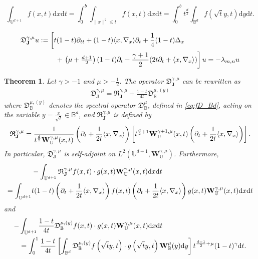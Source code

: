 \documentclass[10pt,a4paper]{amsart}
\newtheorem{thm}{Theorem}
\def\BB{{\mathbb B}}
\def\Jb{{\mathbf J}}
\def\UU{{\mathbb U}}
\def\Wb{{\mathbf W}}
\def\d{\mathrm{d}}
\def\f{\frac}
\def\fD{{\mathfrak D}}
\def\fR{{\mathfrak R}}
\def\g{{\gamma}}
\def\l{{\lambda}}
\def\la{{\langle}}
\def\ra{{\rangle}}
\begin{document}
\begin{equation}\label{intUU=}
  \int_{\UU^{d+1} } f(x,t) \d x \d t  = \int_0^b \int_{\|x\|^2 \le t} f(x,t) \d x \d t =
    \int_0^b t^{\frac{d}{2}} \int_{\BB^d} f\left(\sqrt{t} y, t\right) \d y \d t. 
\end{equation}

\begin{align}\label{eq:diff-eqnUU}
 & \fD_{\Jb}^{\g,\mu} u : = \left[ t (1-t) \partial_{tt} + (1-t) \la x,\nabla_x\ra \partial_t + \frac{1}{4} (1-t)\Delta_x  \right. \\
      & \qquad   \qquad  \quad
      +\left.   \left(\mu+\tfrac{d+1}{2}\right)(1-t)\partial_t   - \frac{\g+1}{2} (2t \partial_t +  \la x,\nabla_x\ra) \right]  u 
       = - \l_{m,n} u \notag
\end{align}

\begin{thm} 
Let $\g > -1$ and $\mu > -\f12$. The operator $ \fD_{\Jb}^{\g,\mu}$ can be rewritten as
\begin{align} \label{eq:fD_UU2}
 \fD_{\Jb}^{\g,\mu} =  \fR_\Jb^{\g,\mu}  + \frac{1-t}{4t} \fD_\BB^{\mu, (y)}
\end{align}
where $\fD_\BB^{\mu, (y)}$ denotes the spectral operator $\fD_\BB^\mu$, defined in \eqref{eq:fD_Bd}, acting on 
the variable $y = \frac{x}{\sqrt{t}} \in \BB^d$, and $\fR_\Jb^{\g,\mu} $ is defined by 
\begin{align*}
 \fR_\Jb^{\g,\mu} =  \frac{1}{t^{\f d 2} \Wb_\UU^{\g,\mu}(x,t)} \left( \partial_t + \frac{1}{2t} \la x ,\nabla_x\ra \right) 
  \left[t^{\f{d}{2} +1} \Wb_\UU^{\g+1,\mu}(x,t) \left( \partial_t + \frac{1}{2t} \la x ,\nabla_x\ra \right) \right]. \notag
 \end{align*}
In particular, $\fD_\Jb^{\g,\mu}$ is self-adjoint on $L^2(\UU^{d+1}, \Wb_{\UU}^{\g,\mu})$. Furthermore, 
\begin{align}\label{eq:int_fDU1}
  &  - \int_{\UU^{d+1}} \fR_{\Jb}^{\g,\mu} f(x,t)\cdot g(x,t) \Wb_{\UU}^{\g,\mu}(x,t) \d x \d t \\
 =  \int_{\UU^{d+1}} & t(1-t)  \left( \partial_t + \frac{1}{2t} \la x ,\nabla_x\ra \right) f(x,t)  \left( \partial_t + \frac{1}{2t} \la x ,\nabla_x\ra \right) g(x,t) \Wb_{\UU}^{\g,\mu}(x,t) \d x \d t \notag
\end{align}
and
\begin{align}\label{eq:int_fDU2}
 - & \int_{\UU^{d+1}}  \frac{1-t}{4t} \fD_{\BB}^{\mu, (y)} f(x,t)\cdot g(x,t) \Wb_{\UU}^{\g,\mu}(x,t) \d x \d t \\
  & =  \int_0^1 \frac{1-t}{4t} \left[ \int_{\BB^d} \fD_\BB^{\mu, (y)} f\left(\sqrt{t} y, t\right ) \cdot g\left(\sqrt{t} y, t\right)
   \Wb_\BB^\mu (y) \d y\right]  t^{\f{d-1}{2} + \mu}(1-t)^\g \d t. \notag
\end{align}
\end{thm}
\end{document}
